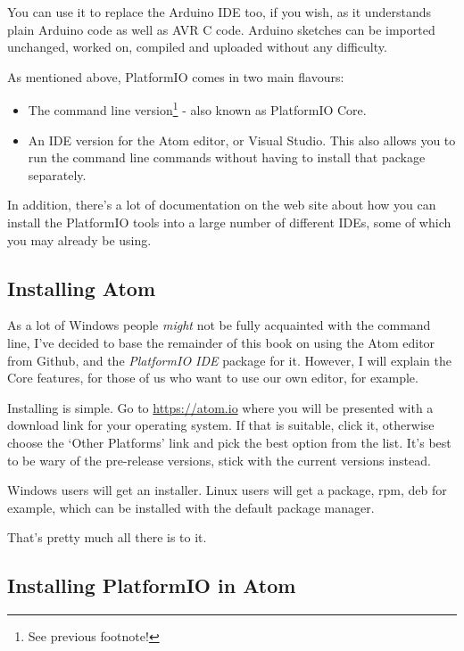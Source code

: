 You can use it to replace the  Arduino IDE too, if you wish, as it understands plain  Arduino code as well as AVR C code.  Arduino sketches can be imported unchanged, worked on, compiled and uploaded without any difficulty.

As mentioned above, PlatformIO comes in two main flavours:

\begin{itemize}
\item
  The command line version\footnote{See previous footnote!} - also known as PlatformIO Core.
\item
  An IDE version for the Atom editor, or Visual Studio. This also allows   you to run the command line commands without having to install that   package separately.
\end{itemize}

In addition, there's a lot of documentation on the web site about how you can install the PlatformIO tools into a large number of different IDEs, some of which you may already be using.

\subsection{Installing Atom}\label{installing-atom}

As a lot of Windows people \emph{might} not be fully acquainted with the command line, I've decided to base the remainder of this book on using the Atom editor from Github, and the \emph{PlatformIO IDE} package for it. However, I will explain the Core features, for those of us who want to use our own editor, for example.

Installing is simple. Go to \href{https://atom.io}{https://atom.io} where you will be presented with a download link for your operating system. If that is suitable, click it, otherwise choose the `Other Platforms' link and pick the best option from the list. It's best to be wary of the pre-release versions, stick with the current versions instead.

Windows users will get an installer. Linux users will get a package, rpm, deb for example, which can be installed with the default package manager.

That's pretty much all there is to it.

\subsection{Installing PlatformIO in Atom}\label{installing-platformio-in-atom}

